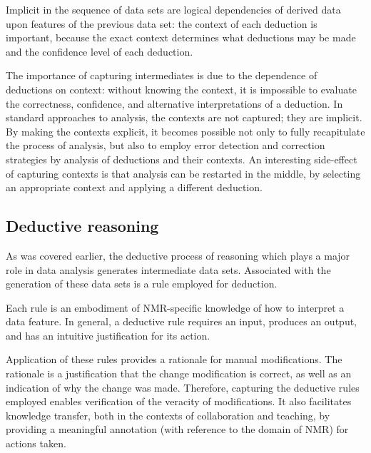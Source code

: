 Implicit in the sequence of data sets are logical dependencies of derived
data upon features of the previous data set: the context of each deduction
is important, because the exact context determines what deductions may be
made and the confidence level of each deduction. %


The importance of capturing intermediates is due to the dependence of 
deductions on context: without knowing the context, it is impossible to 
evaluate the correctness, confidence, and alternative interpretations of
a deduction.  In standard approaches to analysis, the contexts are not
captured; they are implicit.  By making the contexts explicit, it becomes
possible not only to fully recapitulate the process of analysis, but also 
to employ error detection and correction strategies by analysis
of deductions and their contexts.  
An interesting side-effect of capturing
contexts is that analysis can be restarted in the middle, by selecting an
appropriate context and applying a different deduction.


\subsection{Deductive reasoning}
As was covered earlier, the deductive process of reasoning which plays
a major role in data analysis generates intermediate data sets.  Associated
with the generation of these data sets is a rule employed for deduction.

Each rule is an embodiment of NMR-specific knowledge of how to interpret a
data feature.  In general, a deductive rule requires an input, produces an
output, and has an intuitive justification for its action.  

Application of these rules provides a rationale for manual modifications.  The
rationale is a justification that the change modification is correct, as
well as an indication of why the change was made.  Therefore, capturing the
deductive rules employed enables verification of the veracity of modifications. 
It also facilitates knowledge transfer, both in the contexts of collaboration
and teaching, by providing a meaningful annotation (with reference to the
domain of NMR) for actions taken.

